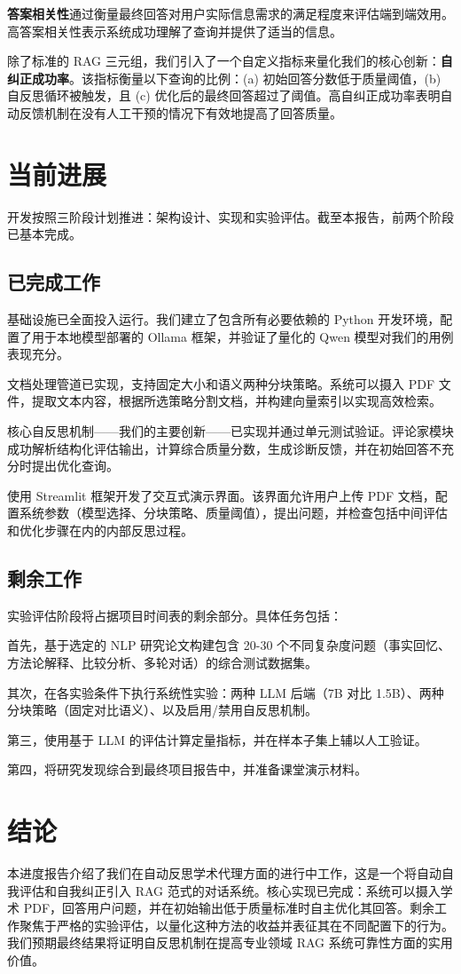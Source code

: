 \documentclass[11pt,a4paper]{article}
\begin{document}
\textbf{答案相关性}通过衡量最终回答对用户实际信息需求的满足程度来评估端到端效用。高答案相关性表示系统成功理解了查询并提供了适当的信息。

除了标准的 RAG 三元组，我们引入了一个自定义指标来量化我们的核心创新：\textbf{自纠正成功率}。该指标衡量以下查询的比例：(a) 初始回答分数低于质量阈值，(b) 自反思循环被触发，且 (c) 优化后的最终回答超过了阈值。高自纠正成功率表明自动反馈机制在没有人工干预的情况下有效地提高了回答质量。

\section{当前进展}

开发按照三阶段计划推进：架构设计、实现和实验评估。截至本报告，前两个阶段已基本完成。

\subsection{已完成工作}

基础设施已全面投入运行。我们建立了包含所有必要依赖的 Python 开发环境，配置了用于本地模型部署的 Ollama 框架，并验证了量化的 Qwen 模型对我们的用例表现充分。

文档处理管道已实现，支持固定大小和语义两种分块策略。系统可以摄入 PDF 文件，提取文本内容，根据所选策略分割文档，并构建向量索引以实现高效检索。

核心自反思机制——我们的主要创新——已实现并通过单元测试验证。评论家模块成功解析结构化评估输出，计算综合质量分数，生成诊断反馈，并在初始回答不充分时提出优化查询。

使用 Streamlit 框架开发了交互式演示界面。该界面允许用户上传 PDF 文档，配置系统参数（模型选择、分块策略、质量阈值），提出问题，并检查包括中间评估和优化步骤在内的内部反思过程。

\subsection{剩余工作}

实验评估阶段将占据项目时间表的剩余部分。具体任务包括：

首先，基于选定的 NLP 研究论文构建包含 20-30 个不同复杂度问题（事实回忆、方法论解释、比较分析、多轮对话）的综合测试数据集。

其次，在各实验条件下执行系统性实验：两种 LLM 后端（7B 对比 1.5B）、两种分块策略（固定对比语义）、以及启用/禁用自反思机制。

第三，使用基于 LLM 的评估计算定量指标，并在样本子集上辅以人工验证。

第四，将研究发现综合到最终项目报告中，并准备课堂演示材料。

\section{结论}

本进度报告介绍了我们在自动反思学术代理方面的进行中工作，这是一个将自动自我评估和自我纠正引入 RAG 范式的对话系统。核心实现已完成：系统可以摄入学术 PDF，回答用户问题，并在初始输出低于质量标准时自主优化其回答。剩余工作聚焦于严格的实验评估，以量化这种方法的收益并表征其在不同配置下的行为。我们预期最终结果将证明自反思机制在提高专业领域 RAG 系统可靠性方面的实用价值。
\end{document}
